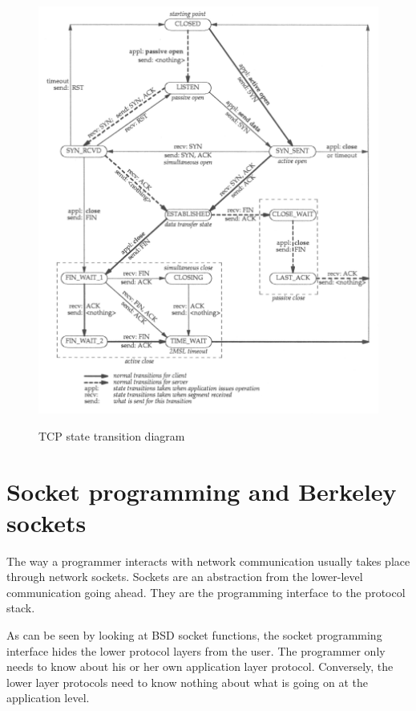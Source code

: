 \documentclass[11pt,twoside,abstract,notitlepage]{scrreprt}
\begin{document}
\begin{figure}
\normalsize
\centerline{\includegraphics[width=1.0\textwidth]{images/state-diagram-big.png}
\label{fig:tcpstatediagram}}
\caption{TCP state transition diagram}
\end{figure}


\section{Socket programming and Berkeley sockets} 
The way a programmer interacts with network communication usually takes place through network sockets. Sockets are an abstraction from the lower-level communication going ahead. They are the programming interface to the protocol stack.

As can be seen by looking at BSD socket functions, the socket programming interface hides the lower protocol layers from the user. The programmer only needs to know about his or her own application layer protocol. Conversely, the lower layer protocols need to know nothing about what is going on at the application level.
\end{document}

